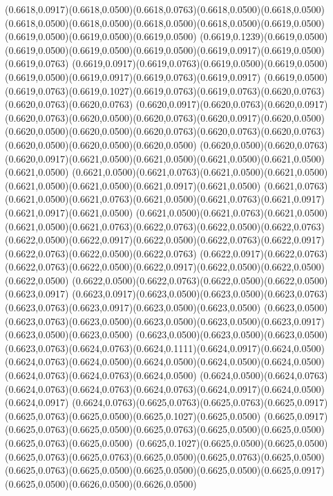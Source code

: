 (0.6618,0.0917)(0.6618,0.0500)(0.6618,0.0763)(0.6618,0.0500)(0.6618,0.0500)
\PST@Solid(0.6618,0.0500)(0.6618,0.0500)(0.6618,0.0500)(0.6618,0.0500)(0.6619,0.0500)(0.6619,0.0500)(0.6619,0.0500)(0.6619,0.0500)
(0.6619,0.1239)(0.6619,0.0500)(0.6619,0.0500)(0.6619,0.0500)(0.6619,0.0500)(0.6619,0.0917)(0.6619,0.0500)(0.6619,0.0763)
(0.6619,0.0917)(0.6619,0.0763)(0.6619,0.0500)(0.6619,0.0500)(0.6619,0.0500)(0.6619,0.0917)(0.6619,0.0763)(0.6619,0.0917)
(0.6619,0.0500)(0.6619,0.0763)(0.6619,0.1027)(0.6619,0.0763)(0.6619,0.0763)(0.6620,0.0763)(0.6620,0.0763)(0.6620,0.0763)
(0.6620,0.0917)(0.6620,0.0763)(0.6620,0.0917)(0.6620,0.0763)(0.6620,0.0500)(0.6620,0.0763)(0.6620,0.0917)(0.6620,0.0500)
(0.6620,0.0500)(0.6620,0.0500)(0.6620,0.0763)(0.6620,0.0763)(0.6620,0.0763)(0.6620,0.0500)(0.6620,0.0500)(0.6620,0.0500)
(0.6620,0.0500)(0.6620,0.0763)(0.6620,0.0917)(0.6621,0.0500)(0.6621,0.0500)(0.6621,0.0500)(0.6621,0.0500)(0.6621,0.0500)
(0.6621,0.0500)(0.6621,0.0763)(0.6621,0.0500)(0.6621,0.0500)(0.6621,0.0500)(0.6621,0.0500)(0.6621,0.0917)(0.6621,0.0500)
(0.6621,0.0763)(0.6621,0.0500)(0.6621,0.0763)(0.6621,0.0500)(0.6621,0.0763)(0.6621,0.0917)(0.6621,0.0917)(0.6621,0.0500)
(0.6621,0.0500)(0.6621,0.0763)(0.6621,0.0500)(0.6621,0.0500)(0.6621,0.0763)(0.6622,0.0763)(0.6622,0.0500)(0.6622,0.0763)
(0.6622,0.0500)(0.6622,0.0917)(0.6622,0.0500)(0.6622,0.0763)(0.6622,0.0917)(0.6622,0.0763)(0.6622,0.0500)(0.6622,0.0763)
(0.6622,0.0917)(0.6622,0.0763)(0.6622,0.0763)(0.6622,0.0500)(0.6622,0.0917)(0.6622,0.0500)(0.6622,0.0500)(0.6622,0.0500)
(0.6622,0.0500)(0.6622,0.0763)(0.6622,0.0500)(0.6622,0.0500)(0.6623,0.0917)
\PST@Solid(0.6623,0.0917)(0.6623,0.0500)(0.6623,0.0500)(0.6623,0.0763)(0.6623,0.0763)(0.6623,0.0917)(0.6623,0.0500)(0.6623,0.0500)
(0.6623,0.0500)(0.6623,0.0763)(0.6623,0.0500)(0.6623,0.0500)(0.6623,0.0500)(0.6623,0.0917)(0.6623,0.0500)(0.6623,0.0500)
(0.6623,0.0500)(0.6623,0.0500)(0.6623,0.0500)(0.6623,0.0763)(0.6624,0.0763)(0.6624,0.1111)(0.6624,0.0917)(0.6624,0.0500)
(0.6624,0.0763)(0.6624,0.0500)(0.6624,0.0500)(0.6624,0.0500)(0.6624,0.0500)(0.6624,0.0763)(0.6624,0.0763)(0.6624,0.0500)
(0.6624,0.0500)(0.6624,0.0763)(0.6624,0.0763)(0.6624,0.0763)(0.6624,0.0763)(0.6624,0.0917)(0.6624,0.0500)(0.6624,0.0917)
(0.6624,0.0763)(0.6625,0.0763)(0.6625,0.0763)(0.6625,0.0917)(0.6625,0.0763)(0.6625,0.0500)(0.6625,0.1027)(0.6625,0.0500)
(0.6625,0.0917)(0.6625,0.0763)(0.6625,0.0500)(0.6625,0.0763)(0.6625,0.0500)(0.6625,0.0500)(0.6625,0.0763)(0.6625,0.0500)
(0.6625,0.1027)(0.6625,0.0500)(0.6625,0.0500)(0.6625,0.0763)(0.6625,0.0763)(0.6625,0.0500)(0.6625,0.0763)(0.6625,0.0500)
(0.6625,0.0763)(0.6625,0.0500)(0.6625,0.0500)(0.6625,0.0500)(0.6625,0.0917)(0.6625,0.0500)(0.6626,0.0500)(0.6626,0.0500)
